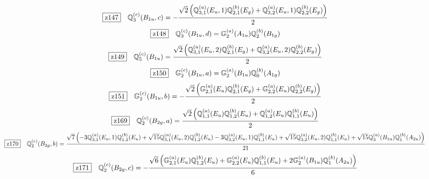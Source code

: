 \documentclass[fleqn,10pt,landscape]{jsarticle}
\begin{document}
\begin{dmath*}
\hspace*{3mm}\fbox{z147}\quad \mathbb{Q}_{3}^{(c)}(B_{1u},c)=- \frac{\sqrt{2} \left(\mathbb{Q}_{3,1}^{(a)}(E_{u},1) \mathbb{Q}_{2,1}^{(b)}(E_{g}) + \mathbb{Q}_{3,2}^{(a)}(E_{u},1) \mathbb{Q}_{2,2}^{(b)}(E_{g})\right)}{2}
\end{dmath*}
\begin{dmath*}
\hspace*{3mm}\fbox{z148}\quad \mathbb{Q}_{3}^{(c)}(B_{1u},d)=\mathbb{G}_{2}^{(a)}(A_{1u}) \mathbb{Q}_{2}^{(b)}(B_{1g})
\end{dmath*}
\begin{dmath*}
\hspace*{3mm}\fbox{z149}\quad \mathbb{Q}_{5}^{(c)}(B_{1u})=\frac{\sqrt{2} \left(\mathbb{Q}_{3,1}^{(a)}(E_{u},2) \mathbb{Q}_{2,1}^{(b)}(E_{g}) + \mathbb{Q}_{3,2}^{(a)}(E_{u},2) \mathbb{Q}_{2,2}^{(b)}(E_{g})\right)}{2}
\end{dmath*}
\begin{dmath*}
\hspace*{3mm}\fbox{z150}\quad \mathbb{G}_{2}^{(c)}(B_{1u},a)=\mathbb{G}_{2}^{(a)}(B_{1u}) \mathbb{Q}_{0}^{(b)}(A_{1g})
\end{dmath*}
\begin{dmath*}
\hspace*{3mm}\fbox{z151}\quad \mathbb{G}_{2}^{(c)}(B_{1u},b)=- \frac{\sqrt{2} \left(\mathbb{G}_{2,1}^{(a)}(E_{u}) \mathbb{Q}_{2,1}^{(b)}(E_{g}) + \mathbb{G}_{2,2}^{(a)}(E_{u}) \mathbb{Q}_{2,2}^{(b)}(E_{g})\right)}{2}
\end{dmath*}
\begin{dmath*}
\hspace*{3mm}\fbox{z169}\quad \mathbb{Q}_{2}^{(c)}(B_{2g},a)=\frac{\sqrt{2} \left(\mathbb{Q}_{1,1}^{(a)}(E_{u}) \mathbb{Q}_{1,2}^{(b)}(E_{u}) + \mathbb{Q}_{1,2}^{(a)}(E_{u}) \mathbb{Q}_{1,1}^{(b)}(E_{u})\right)}{2}
\end{dmath*}
\begin{dmath*}
\hspace*{3mm}\fbox{z170}\quad \mathbb{Q}_{2}^{(c)}(B_{2g},b)=\frac{\sqrt{7} \left(- 3 \mathbb{Q}_{3,1}^{(a)}(E_{u},1) \mathbb{Q}_{1,2}^{(b)}(E_{u}) + \sqrt{15} \mathbb{Q}_{3,1}^{(a)}(E_{u},2) \mathbb{Q}_{1,2}^{(b)}(E_{u}) - 3 \mathbb{Q}_{3,2}^{(a)}(E_{u},1) \mathbb{Q}_{1,1}^{(b)}(E_{u}) + \sqrt{15} \mathbb{Q}_{3,2}^{(a)}(E_{u},2) \mathbb{Q}_{1,1}^{(b)}(E_{u}) + \sqrt{15} \mathbb{Q}_{3}^{(a)}(B_{1u}) \mathbb{Q}_{1}^{(b)}(A_{2u})\right)}{21}
\end{dmath*}
\begin{dmath*}
\hspace*{3mm}\fbox{z171}\quad \mathbb{Q}_{2}^{(c)}(B_{2g},c)=- \frac{\sqrt{6} \left(\mathbb{G}_{2,1}^{(a)}(E_{u}) \mathbb{Q}_{1,2}^{(b)}(E_{u}) + \mathbb{G}_{2,2}^{(a)}(E_{u}) \mathbb{Q}_{1,1}^{(b)}(E_{u}) + 2 \mathbb{G}_{2}^{(a)}(B_{1u}) \mathbb{Q}_{1}^{(b)}(A_{2u})\right)}{6}
\end{dmath*}
\end{document}
